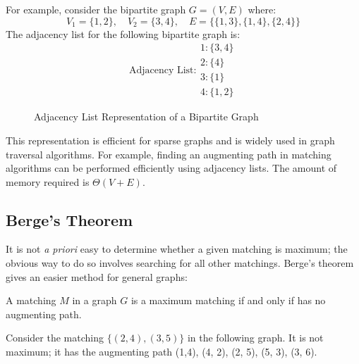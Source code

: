 For example, consider the bipartite graph \( G = (V, E) \) where:
\[
V_1 = \{1, 2\}, \quad V_2 = \{3, 4\}, \quad E = \{\{1, 3\}, \{1, 4\}, \{2, 4\}\}
\]
The adjacency list for the following bipartite graph is:
\[
\text{Adjacency List:}
\begin{array}{l}
1: \{3, 4\} \\
2: \{4\} \\
3: \{1\} \\
4: \{1, 2\}
\end{array}
\]

\begin{figure}[h]
\begin{center}
\caption{Adjacency List Representation of a Bipartite Graph}
\label{fig:adj_list}
\end{center}
\end{figure}

This representation is efficient for sparse graphs and is widely used in graph traversal algorithms. For example, finding an augmenting path in matching algorithms can be performed efficiently using adjacency lists. The amount of memory required is $\Theta(V+E)$.

\subsection{Berge's Theorem}
It is not \textit{a priori} easy to determine whether a given matching is maximum; the obvious way to do so involves searching for all other matchings.
Berge's theorem gives an easier method for general graphs:

\begin{theorem}\label{berge} \cite{berge}
    A matching $M$ in a graph $G$ is a maximum matching if and only if has no augmenting path.
\end{theorem}

Consider the matching $\{(2, 4), (3, 5)\}$ in the following graph. It is not maximum; it has the augmenting path (1,4), (4, 2), (2, 5), (5, 3), (3, 6).

